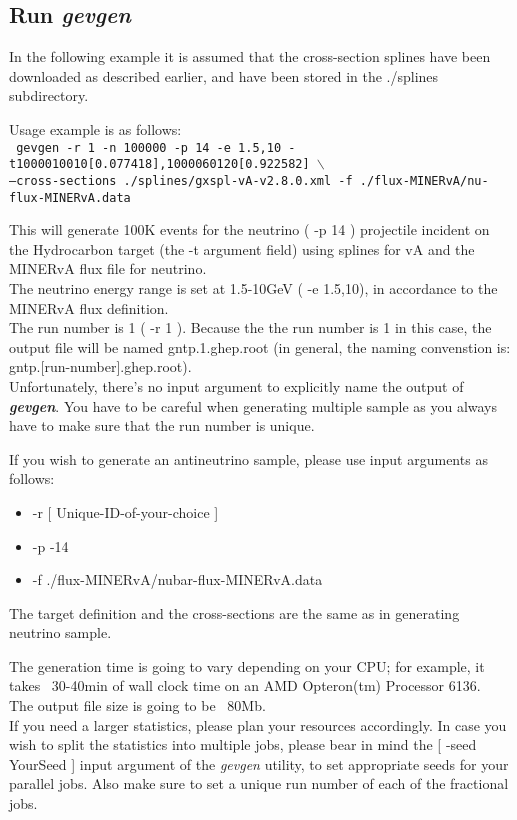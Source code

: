 \subsection{Run {\it gevgen} }

In the following example it is assumed that the cross-section splines have been downloaded as described earlier, 
and have been stored in the ./splines subdirectory.

Usage example is as follows: \\
{\tt
gevgen -r 1 -n 100000 -p 14 -e 1.5,10 -t1000010010[0.077418],1000060120[0.922582] $\backslash$ \\
--cross-sections ./splines/gxspl-vA-v2.8.0.xml -f ./flux-MINERvA/nu-flux-MINERvA.data
}

This will generate 100K events for the neutrino ( -p 14 ) projectile incident on the 
Hydrocarbon target (the -t argument field) using splines for vA and the MINERvA flux file for neutrino. \\
The neutrino energy range is set at 1.5-10GeV ( -e 1.5,10), in accordance to the MINERvA flux definition. \\
The run number is 1 ( -r 1 ). 
Because the the run number is 1 in this case, the output file will be named gntp.1.ghep.root 
(in general, the naming convenstion is: gntp.[run-number].ghep.root). \\
Unfortunately, there's no input argument to explicitly name the output of { \bf \it gevgen}.
You have to be careful when generating multiple sample as you always have to make sure that
the run number is unique. 

If you wish to generate an antineutrino sample, please use input arguments as follows:
\begin{itemize}
\item{-r [ Unique-ID-of-your-choice ]}
\item{ -p -14}
\item{ -f ./flux-MINERvA/nubar-flux-MINERvA.data}
\end{itemize}
The target definition and the cross-sections are the same as in generating neutrino sample. 

The generation time is going to vary depending on your CPU; for example, it takes ~30-40min 
of wall clock time on an AMD Opteron(tm) Processor 6136. \\
The output file size is going to be ~80Mb. \\
If you need a larger statistics, please plan your resources accordingly.
In case you wish to split the statistics into multiple jobs, please bear in mind the [ -seed YourSeed ] 
input argument of the {\it gevgen} utility, to set appropriate seeds for your parallel jobs.
Also make sure to set a unique run number of each of the fractional jobs.

